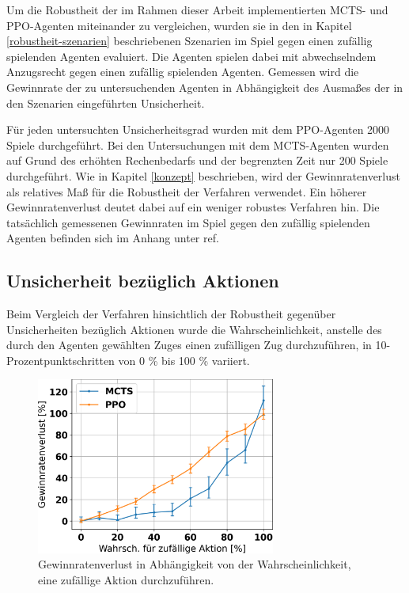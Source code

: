 Um die Robustheit der im Rahmen dieser Arbeit implementierten MCTS- und PPO-Agenten miteinander zu vergleichen, wurden sie in den in Kapitel \ref{robustheit-szenarien} beschriebenen Szenarien im Spiel gegen einen zufällig spielenden Agenten evaluiert. Die Agenten spielen dabei mit abwechselndem Anzugsrecht gegen einen zufällig spielenden Agenten. Gemessen wird die Gewinnrate der zu untersuchenden Agenten in Abhängigkeit des Ausmaßes der in den Szenarien eingeführten Unsicherheit.

Für jeden untersuchten Unsicherheitsgrad wurden mit dem PPO-Agenten 2000 Spiele durchgeführt. Bei den Untersuchungen mit dem MCTS-Agenten wurden auf Grund des erhöhten Rechenbedarfs und der begrenzten Zeit nur 200 Spiele durchgeführt. Wie in Kapitel \ref{konzept} beschrieben, wird der Gewinnratenverlust als relatives Maß für die Robustheit der Verfahren verwendet. Ein höherer Gewinnratenverlust deutet dabei auf ein weniger robustes Verfahren hin. Die tatsächlich gemessenen Gewinnraten im Spiel gegen den zufällig spielenden Agenten befinden sich im Anhang unter ref{}.

\subsection{Unsicherheit bezüglich Aktionen}

Beim Vergleich der Verfahren hinsichtlich der Robustheit gegenüber Unsicherheiten bezüglich Aktionen wurde die Wahrscheinlichkeit, anstelle des durch den Agenten gewählten Zuges einen zufälligen Zug durchzuführen, in 10-Prozentpunktschritten von 0 \% bis 100 \% variiert.

\begin{figure}[ht!]%
	\includegraphics[width=0.7\textwidth, center]{Bilder/robustness-results/uncertain_actions_win_rate_losses.png}
	\caption{Gewinnratenverlust in Abhängigkeit von der Wahrscheinlichkeit, eine zufällige Aktion durchzuführen.}
\end{figure}

